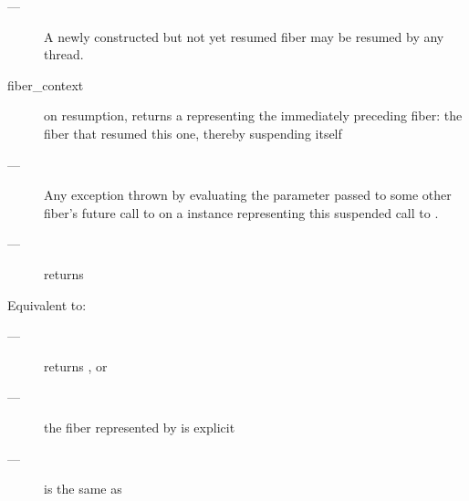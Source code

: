\remarks
\begin{description}
    \item[---] A newly constructed but not yet resumed fiber may be resumed by
              any thread.
\end{description}

\returns
\begin{description}
    \item[fiber\_context] on resumption, \resumewith returns a \fiber
               representing the immediately preceding fiber: the fiber that
               resumed this one, thereby suspending itself
\end{description}

\except
\begin{description}
    \item[---] Any exception thrown by evaluating the  parameter
               passed to some other fiber's future call to
               \resumewith on a \fiber instance representing this suspended
               call to \resumewith.
\end{description}

\postcond
\begin{description}
    \item[---]  returns 
\end{description}




\effects
Equivalent to:\\


\requires
\begin{description}
    \item[---]  returns , or
    \item[---] the fiber represented by  is explicit
    \item[---] \currthread is the same as \lastthread
\end{description}

